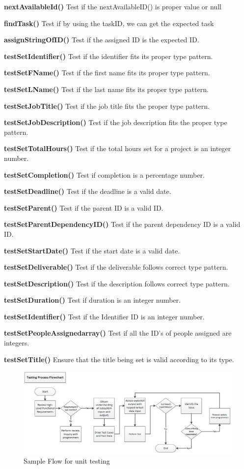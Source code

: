 \documentclass[12pt]{article}
\begin{document}
{\bf nextAvailableId()}
{
Test if the nextAvailableID() is proper value or null
}

{\bf findTask()}
{
Test if by using the taskID, we can get the expected task
}

{\bf assignStringOfID()} 
{
Test if the assigned ID is the expected ID.
}

{\bf testSetIdentifier()}
{
Test if the identifier fits its proper type pattern.
}

{\bf testSetFName()}
{
Test if the first name fits its proper type pattern.
}

{\bf testSetLName()}
{
Test if the last name fits its proper type pattern. 
}

{\bf testSetJobTitle()}{
Test if the job title fits the proper type pattern.
}

{\bf testSetJobDescription()}{
Test if the job description fits the proper type pattern.
}

{\bf testSetTotalHours()}{
Test if the total hours set for a project is an integer number.
}

{\bf testSetCompletion()}{
Test if completion is a percentage number.
}

{\bf testSetDeadline()}{
Test if the deadline is a valid date.
}

{\bf testSetParent()}{
Test if the parent ID is a valid ID.
}

{\bf testSetParentDependencyID()}{
Test if the parent dependency ID is a valid ID. 
}

{\bf testSetStartDate()}{
Test if the start date is a valid date.
}

{\bf testSetDeliverable()}{
Test if the deliverable follows correct type pattern.
}

{\bf testSetDescription()}{
Test if the description follows correct type pattern.
}

{\bf testSetDuration()}{
Test if duration is an integer number.
}

{\bf testSetIdentifier()}{
Test if the Identifier ID is an integer number.
}

{\bf testSetPeopleAssignedarray()}{
Test if all the ID's of people assigned are integers.
}

{\bf testSetTitle()}{
Ensure that the title being set is valid according to its type.
}

\begin{figure}[htbp]

\begin{center} \includegraphics[scale=.6]{TestDiagram.jpg} \end{center}
\label{fig:testing-diagram}
\caption{Sample Flow for unit testing}

\end{figure}
\end{document}
